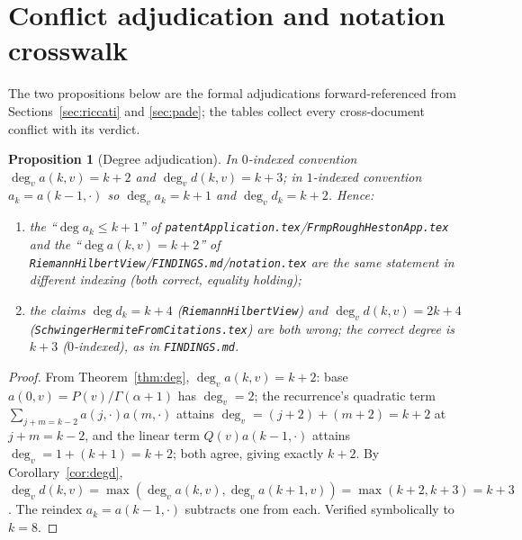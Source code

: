 \documentclass[11pt]{article}
\DeclareMathOperator{\dg}{deg}
\theoremstyle{plain}
\newtheorem{proposition}[theorem]{Proposition}
\theoremstyle{definition}
\theoremstyle{remark}
\begin{document}
\appendix
\section{Conflict adjudication and notation crosswalk}
\label{sec:appendix}

The two propositions below are the formal adjudications forward-referenced from
Sections~\ref{sec:riccati} and \ref{sec:pade}; the tables collect every
cross-document conflict with its verdict.

\begin{proposition}[Degree adjudication]\label{prop:deg-verdict}
In $0$-indexed convention $\dg_v a(k,v)=k+2$ and $\dg_v d(k,v)=k+3$; in $1$-indexed
convention $a_k=a(k-1,\cdot)$ so $\dg_v a_k=k+1$ and $\dg_v d_k=k+2$. Hence:
\begin{enumerate}[label=(\alph*),leftmargin=2em]
\item the ``$\dg a_k\le k+1$'' of \texttt{patentApplication.tex}/\texttt{FrmpRoughHestonApp.tex}
and the ``$\dg a(k,v)=k+2$'' of \texttt{RiemannHilbertView}/\texttt{FINDINGS.md}/\texttt{notation.tex}
are the \emph{same statement} in different indexing (both \emph{correct}, equality
holding);
\item the claims $\dg d_k=k+4$ (\texttt{RiemannHilbertView}) and $\dg_v d(k,v)=2k+4$
(\texttt{SchwingerHermiteFromCitations.tex}) are \emph{both wrong}; the correct
degree is $k+3$ ($0$-indexed), as in \texttt{FINDINGS.md}.
\end{enumerate}
\end{proposition}
\begin{proof}
From Theorem~\ref{thm:deg}, $\dg_v a(k,v)=k+2$: base $a(0,v)=P(v)/\Gamma(\alpha+1)$
has $\dg_v=2$; the recurrence's quadratic term $\sum_{j+m=k-2}a(j,\cdot)a(m,\cdot)$
attains $\dg_v=(j+2)+(m+2)=k+2$ at $j+m=k-2$, and the linear term $Q(v)a(k-1,\cdot)$
attains $\dg_v=1+(k+1)=k+2$; both agree, giving exactly $k+2$. By Corollary~\ref{cor:degd},
$\dg_v d(k,v)=\max(\dg_v a(k,v),\dg_v a(k+1,v))=\max(k+2,k+3)=k+3$. The reindex
$a_k=a(k-1,\cdot)$ subtracts one from each. Verified symbolically to $k=8$.
\end{proof}
\end{document}
